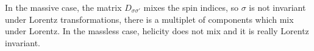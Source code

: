 \documentclass[../main.tex]{subfiles}
\begin{document}
In the massive case, the matrix $D_{\sigma\sigma'}$ mixes the spin indices, so $\sigma$ is not invariant under Lorentz transformations, there is a multiplet of components which mix under Lorentz. In the massless case, helicity does not mix and it is really Lorentz invariant.
\end{document}
